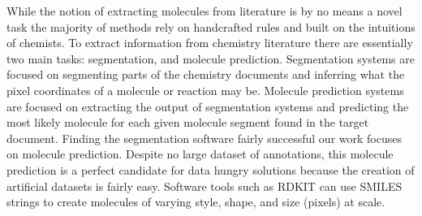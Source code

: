 While the notion of extracting molecules from literature is by no means a novel task the majority of methods rely on handcrafted rules and built on the intuitions of chemists. To extract information from chemistry literature there are essentially two main tasks: segmentation, and molecule prediction. Segmentation systems are focused on segmenting parts of the chemistry documents and inferring what the pixel coordinates of a molecule or reaction may be. Molecule prediction systems are focused on extracting the output of segmentation systems and predicting the most likely molecule for each given molecule segment found in the target document. Finding the segmentation software fairly successful our work focuses on molecule prediction. Despite no large dataset of annotations, this molecule prediction is a perfect candidate for data hungry solutions because the creation of artificial datasets is fairly easy. Software tools such as RDKIT can use SMILES strings to create molecules of varying style, shape, and size (pixels) at scale. \\
